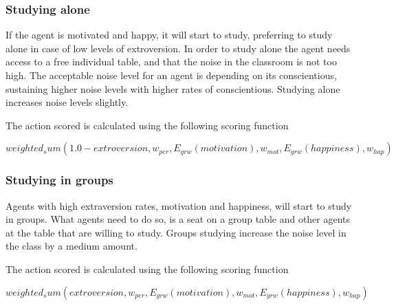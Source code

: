 \subsubsection{Studying alone}
If the agent is motivated and happy, it will start to study, preferring
to study alone in case of low levels of extroversion. In order to study alone the
agent needs access to a free individual table, and that the noise in the classroom
is not too high. The acceptable noise level for an agent is depending on its
conscientious, sustaining higher noise levels with higher rates of conscientious.
Studying alone increases noise levels slightly.

The action scored is calculated using the following scoring function

\begin{equation}
    weighted_sum(1.0 - extroversion, w_{per}, E_{grw}(motivation), w_{mot}, E_{grw}(happiness), w_{hap})
\end{equation}

\subsubsection{Studying in groups}
Agents with high extraversion rates, motivation and happiness, will start to study
in groups. What agents need to do so, is a seat on a group table and other agents
at the table that are willing to study. Groups studying increase the noise level
in the class by a medium amount.

The action scored is calculated using the following scoring function

\begin{equation}
    weighted_sum(extroversion, w_{per}, E_{grw}(motivation), w_{mot}, E_{grw}(happiness), w_{hap})
\end{equation}
